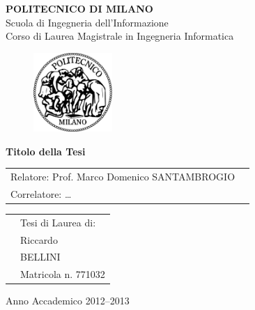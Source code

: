 \documentclass[a4paper]{report}
\begin{document}
\begin{titlepage}

\begin{center}
\LARGE
\textbf{POLITECNICO DI MILANO} \\
\Large
Scuola di Ingegneria dell'Informazione \\
Corso di Laurea Magistrale in Ingegneria Informatica
\end{center}

\addvspace{1.5cm}
\begin{figure}[h]
\begin{center}
\includegraphics[width=3cm]{figure/PoliMi}
\end{center}
\end{figure}

\addvspace{0.75cm}
\begin{center}
\LARGE
\textbf{Titolo della Tesi}
\end{center}

\addvspace{4cm}
\Large
\begin{center}
\begin{tabular}{p{}p{}}
Relatore: Prof. Marco Domenico SANTAMBROGIO& \\
Correlatore: \dots& \\ %
\end{tabular}
\end{center}

\addvspace{2cm}
\Large
\begin{center}
\begin{tabular}{p{}p{}}
& Tesi di Laurea di: \\
& Riccardo \\ 
& BELLINI \\
& Matricola n. 771032
\end{tabular}
\end{center}

\vfill
\Large
\begin{center}
Anno Accademico 2012--2013
\end{center}
\end{titlepage}
\end{document}
